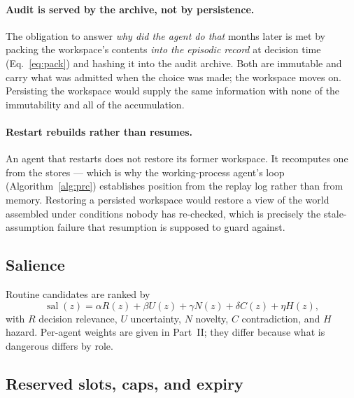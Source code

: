 \documentclass[11pt]{article}
\newcommand{\sal}{\operatorname{sal}}
\begin{document}
\paragraph{Audit is served by the archive, not by persistence.} The obligation to answer \emph{why did the agent do that} months later is met by packing the workspace's contents \emph{into the episodic record} at decision time (Eq.~\eqref{eq:pack}) and hashing it into the audit archive. Both are immutable and carry what was admitted when the choice was made; the workspace moves on. Persisting the workspace would supply the same information with none of the immutability and all of the accumulation.

\paragraph{Restart rebuilds rather than resumes.} An agent that restarts does not restore its former workspace. It recomputes one from the stores --- which is why the working-process agent's loop (Algorithm~\ref{alg:prc}) establishes position from the replay log rather than from memory. Restoring a persisted workspace would restore a view of the world assembled under conditions nobody has re-checked, which is precisely the stale-assumption failure that resumption is supposed to guard against.

\subsection{Salience}

Routine candidates are ranked by
\begin{equation}
\sal(z)=\alpha R(z)+\beta U(z)+\gamma N(z)+\delta C(z)+\eta H(z),
\label{eq:salience}
\end{equation}
with $R$ decision relevance, $U$ uncertainty, $N$ novelty, $C$ contradiction, and $H$ hazard. Per-agent weights are given in Part~II; they differ because what is dangerous differs by role.

\subsection{Reserved slots, caps, and expiry}
\end{document}
